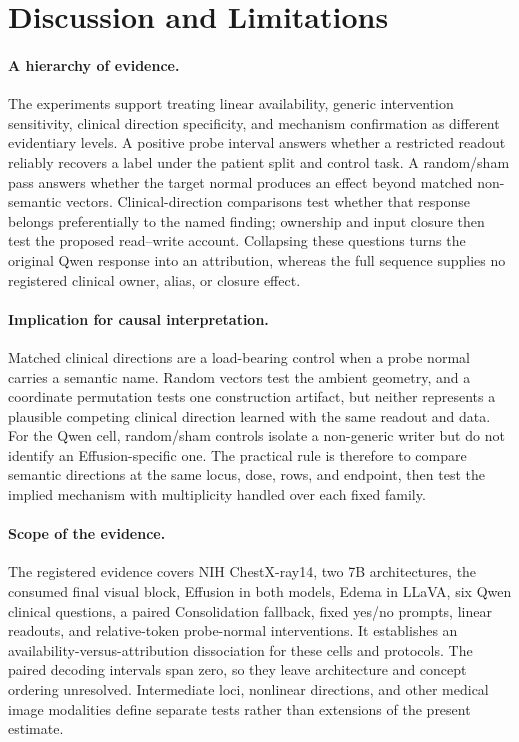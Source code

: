 \section{Discussion and Limitations}
\label{sec:discussion}

\paragraph{A hierarchy of evidence.}
The experiments support treating linear availability, generic intervention sensitivity, clinical direction specificity, and mechanism confirmation as different evidentiary levels. A positive probe interval answers whether a restricted readout reliably recovers a label under the patient split and control task. A random/sham pass answers whether the target normal produces an effect beyond matched non-semantic vectors. Clinical-direction comparisons test whether that response belongs preferentially to the named finding; ownership and input closure then test the proposed read--write account. Collapsing these questions turns the original Qwen response into an attribution, whereas the full sequence supplies no registered clinical owner, alias, or closure effect.

\paragraph{Implication for causal interpretation.}
Matched clinical directions are a load-bearing control when a probe normal carries a semantic name. Random vectors test the ambient geometry, and a coordinate permutation tests one construction artifact, but neither represents a plausible competing clinical direction learned with the same readout and data. For the Qwen cell, random/sham controls isolate a non-generic writer but do not identify an Effusion-specific one. The practical rule is therefore to compare semantic directions at the same locus, dose, rows, and endpoint, then test the implied mechanism with multiplicity handled over each fixed family.

\paragraph{Scope of the evidence.}
The registered evidence covers NIH ChestX-ray14, two 7B architectures, the consumed final visual block, Effusion in both models, Edema in LLaVA, six Qwen clinical questions, a paired Consolidation fallback, fixed yes/no prompts, linear readouts, and relative-token probe-normal interventions. It establishes an availability-versus-attribution dissociation for these cells and protocols. The paired decoding intervals span zero, so they leave architecture and concept ordering unresolved. Intermediate loci, nonlinear directions, and other medical image modalities define separate tests rather than extensions of the present estimate.

